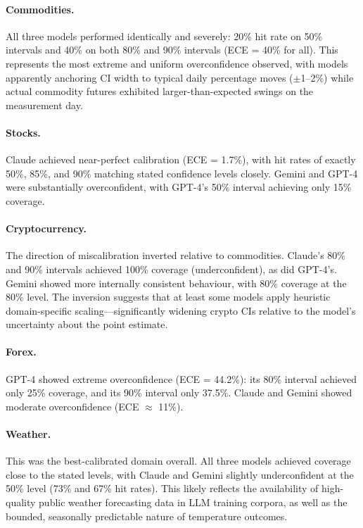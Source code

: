 \documentclass[9pt,twoside,lineno]{pnas-new}
\begin{document}
\paragraph{Commodities.} All three models performed identically and severely: 20\% hit rate on 50\% intervals and 40\% on both 80\% and 90\% intervals (ECE = 40\% for all). This represents the most extreme and uniform overconfidence observed, with models apparently anchoring CI width to typical daily percentage moves ($\pm$1--2\%) while actual commodity futures exhibited larger-than-expected swings on the measurement day.

\paragraph{Stocks.} Claude achieved near-perfect calibration (ECE = 1.7\%), with hit rates of exactly 50\%, 85\%, and 90\% matching stated confidence levels closely. Gemini and GPT-4 were substantially overconfident, with GPT-4's 50\% interval achieving only 15\% coverage.

\paragraph{Cryptocurrency.} The direction of miscalibration inverted relative to commodities. Claude's 80\% and 90\% intervals achieved 100\% coverage (underconfident), as did GPT-4's. Gemini showed more internally consistent behaviour, with 80\% coverage at the 80\% level. The inversion suggests that at least some models apply heuristic domain-specific scaling---significantly widening crypto CIs relative to the model's uncertainty about the point estimate.

\paragraph{Forex.} GPT-4 showed extreme overconfidence (ECE = 44.2\%): its 80\% interval achieved only 25\% coverage, and its 90\% interval only 37.5\%. Claude and Gemini showed moderate overconfidence (ECE $\approx$ 11\%).

\paragraph{Weather.} This was the best-calibrated domain overall. All three models achieved coverage close to the stated levels, with Claude and Gemini slightly underconfident at the 50\% level (73\% and 67\% hit rates). This likely reflects the availability of high-quality public weather forecasting data in LLM training corpora, as well as the bounded, seasonally predictable nature of temperature outcomes.
\end{document}
